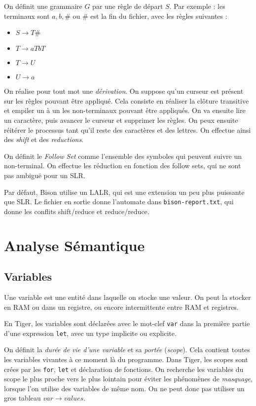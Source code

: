 \documentclass{article}
\begin{document}
On définit une grammaire $G$ par une règle de départ $S$. Par exemple : les terminaux sont ${a,b,\#}$ ou $\#$ est la fin du fichier, avec les règles suivantes :
\begin{itemize}
\item $S \to T \#$
\item $T\to aTbT$
\item $T\to U$
\item $U\to a$
\end{itemize}

On réalise pour tout mot une \emph{dérivation}. On suppose qu'un curseur est présent sur les règles pouvant être appliqué. Cela consiste en réaliser la clôture transitive et empiler un à un les non-terminaux pouvant être appliqués.
On va ensuite lire un caractère, puis avancer le curseur et supprimer les règles. On peux ensuite réitérer le processus tant qu'il reste des caractères et des lettres. On effectue ainsi des \emph{shift} et des \emph{reductions}.


On définit le \emph{Follow Set} comme l'ensemble des symboles qui peuvent suivre un non-terminal. On effectue les réduction en fonction des follow sets, qui ne sont pas ambiguë pour un SLR.


Par défaut, Bison utilise un LALR, qui est une extension un peu plus puissante que SLR. Le fichier en sortie donne l'automate dans \texttt{bison-report.txt}, qui donne les conflits shift/reduce et reduce/reduce.

\section{Analyse Sémantique}
\subsection{Variables}
Une variable est une entité dans laquelle on stocke une valeur. On peut la stocker en RAM ou dans un registre, ou encore intermittente entre RAM et registres.

En Tiger, les variables sont déclarées avec le mot-clef \texttt{var} dans la première partie d'une expression \texttt{let}, avec un type implicite ou explicite.

On définit la \emph{durée de vie d'une variable} et sa \emph{portée} (\emph{scope}). Cela contient toutes les variables vivantes à ce moment là du programme. Dans Tiger, les scopes sont crées par les \texttt{for}, \texttt{let} et déclaration de fonctions. On recherche les variables du scope le plus proche vers le plus lointain pour éviter les phénomènes de \emph{masquage}, lorsque l'on utilise des variables de même nom. On ne peut donc pas utiliser un gros tableau $var \to values$.
\end{document}
